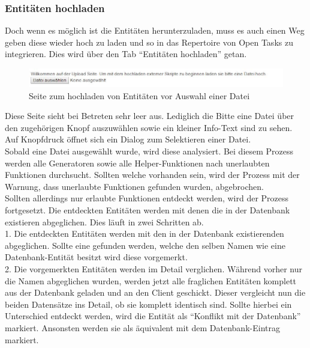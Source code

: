 \subsubsection{Entitäten hochladen}

Doch wenn es möglich ist die Entitäten herunterzuladen, muss es auch einen Weg geben diese wieder hoch zu laden und so in das Repertoire von Open Tasks zu integrieren. Dies wird über den Tab ``Entitäten hochladen'' getan. \\

\begin{figure}[htp]     %
\centering
\includegraphics[width=1\textwidth]{bilder/UploadNoSelect} 
\caption[Seite zum hochladen von Entitäten vor Auswahl einer Datei]{Seite zum hochladen von Entitäten vor Auswahl einer Datei}
\end{figure} 

Diese Seite sieht bei Betreten sehr leer aus. Lediglich die Bitte eine Datei über den zugehörigen Knopf auszuwählen sowie ein kleiner Info-Text sind zu sehen. Auf Knopfdruck öffnet sich ein Dialog zum Selektieren einer Datei. \\
Sobald eine Datei ausgewählt wurde, wird diese analysiert. Bei diesem Prozess werden alle Generatoren sowie alle Helper-Funktionen nach unerlaubten Funktionen durchsucht. Sollten welche vorhanden sein, wird der Prozess mit der Warnung, dass unerlaubte Funktionen gefunden wurden, abgebrochen. \\

Sollten allerdings nur erlaubte Funktionen entdeckt werden, wird der Prozess fortgesetzt. Die entdeckten Entitäten werden mit denen die in der Datenbank existieren abgeglichen. Dies läuft in zwei Schritten ab.\\

1. Die entdeckten Entitäten werden mit den in der Datenbank existierenden abgeglichen. Sollte eine gefunden werden, welche den selben Namen wie eine Datenbank-Entität besitzt wird diese vorgemerkt.\\

2. Die vorgemerkten Entitäten werden im Detail verglichen. Während vorher nur die Namen abgeglichen wurden, werden jetzt alle fraglichen Entitäten komplett aus der Datenbank geladen und an den Client geschickt. Dieser vergleicht nun die beiden Datensätze ins Detail, ob sie komplett identisch sind. Sollte hierbei ein Unterschied entdeckt werden, wird die Entität als ``Konflikt mit der Datenbank'' markiert. Ansonsten werden sie als äquivalent mit dem Datenbank-Eintrag markiert. \\

